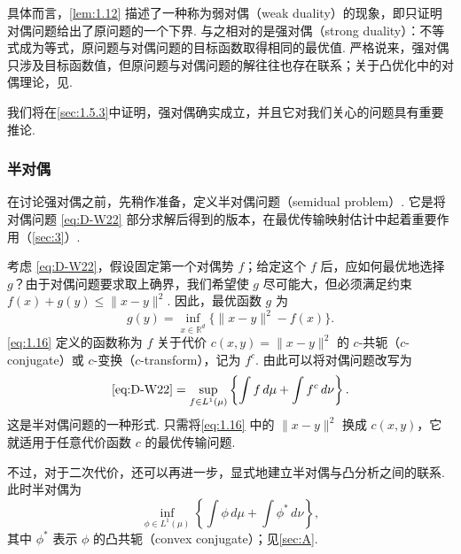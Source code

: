 具体而言，\autoref{lem:1.12} 描述了一种称为弱对偶（weak duality）的现象，即只证明对偶问题给出了原问题的一个下界. 与之相对的是强对偶（strong duality）：不等式成为等式，原问题与对偶问题的目标函数取得相同的最优值. 严格说来，强对偶只涉及目标函数值，但原问题与对偶问题的解往往也存在联系；关于凸优化中的对偶理论，见\cite[第 5 章]{ref52}.

我们将在\autoref{sec:1.5.3}中证明，强对偶确实成立，并且它对我们关心的问题具有重要推论.

\subsubsection{半对偶}\label{sec:1.5.2}

在讨论强对偶之前，先稍作准备，定义半对偶问题（semidual problem）. 它是将对偶问题 \eqref{eq:D-W22} 部分求解后得到的版本，在最优传输映射估计中起着重要作用（\autoref{sec:3}）.

考虑 \eqref{eq:D-W22}，假设固定第一个对偶势 $f$；给定这个 $f$ 后，应如何最优地选择 $g$？由于对偶问题要求取上确界，我们希望使 $g$ 尽可能大，但必须满足约束 $f(x)+g(y)\leq\|x-y\|^2$. 因此，最优函数 $g$ 为
\begin{equation}\label{eq:1.16}
g(y)=\inf_{x\in\mathbb{R}^d}\{\|x-y\|^2-f(x)\}.
\end{equation}
\eqref{eq:1.16} 定义的函数称为 $f$ 关于代价 $c(x,y)=\|x-y\|^2$ 的 $c$-共轭（$c$-conjugate）或 $c$-变换（$c$-transform），记为 $f^c$. 由此可以将对偶问题改写为
\begin{equation}\label{eq:1.17}
\text{\eqref{eq:D-W22}}
=\sup_{f\in L^1(\mu)}\left\{\int f\,d\mu+\int f^c\,d\nu\right\}.
\end{equation}
这是半对偶问题的一种形式. 只需将\eqref{eq:1.16} 中的 $\|x-y\|^2$ 换成 $c(x,y)$，它就适用于任意代价函数 $c$ 的最优传输问题.

不过，对于二次代价，还可以再进一步，显式地建立半对偶与凸分析之间的联系. 此时半对偶为
\begin{equation}\tag{SD}\label{eq:SD}
\inf_{\phi\in L^1(\mu)}\left\{\int\phi\,d\mu+\int\phi^*\,d\nu\right\},
\end{equation}
其中 $\phi^*$ 表示 $\phi$ 的凸共轭（convex conjugate）；见\autoref{sec:A}.

